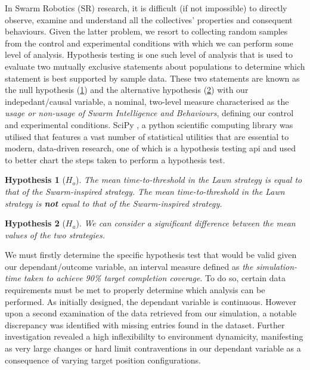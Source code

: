 \documentclass{report}
\newtheorem*{hyp}{Hypothesis}
\begin{document}
In Swarm Robotics (SR) research, it is difficult (if not impossible) to directly observe, examine and understand all the collectives' properties and consequent behaviours. Given the latter problem, we resort to collecting random samples from the control and experimental conditions with which we can perform some level of analysis. Hypothesis testing is one such level of analysis that is used to evaluate two mutually exclusive statements about populations to determine which statement is best supported by sample data. These two statements are known as the null hypothesis (\ref{hyp:null2}) and the alternative hypothesis (\ref{hyp:alt2}) with our indepedant/causal variable, a nominal, two-level measure characterised as the \textit{usage or non-usage of Swarm Intelligence and Behaviours}, defining our control and experimental conditions. SciPy \cite{SCIPY}, a python scientific computing library was utilised that features a vast number of statistical utilities that are essential to modern, data-driven research, one of which is a hypothesis testing api and \cite{bmgi} used to better chart the steps taken to perform a hypothesis test.

\begin{hyp}[$H_o$]\label{hyp:null2}
	The mean time-to-threshold in the Lawn strategy is equal to that of the Swarm-inspired strategy.
	The mean time-to-threshold in the Lawn strategy is \textbf{not} equal to that of the Swarm-inspired strategy.
\end{hyp}
	
\begin{hyp}[$H_a$]\label{hyp:alt2}
	We can consider a significant difference between the mean values of the two strategies.
\end{hyp}

 We must firstly determine the specific hypothesis test that would be valid given our dependant/outcome variable, an interval measure defined as \textit{the simulation-time taken to achieve 90\% target completion coverage}. To do so, certain data requirements must be met to properly determine which analysis can be performed. As initially designed, the dependant variable is continuous. However upon a second examination of the data retrieved from our simulation, a notable discrepancy was identified with missing entries found in the dataset. Further investigation revealed a high inflexibililty to environment dynamicity, manifesting as very large changes or hard limit contraventions in our dependant variable as a consequence of varying target position configurations.
\end{document}
